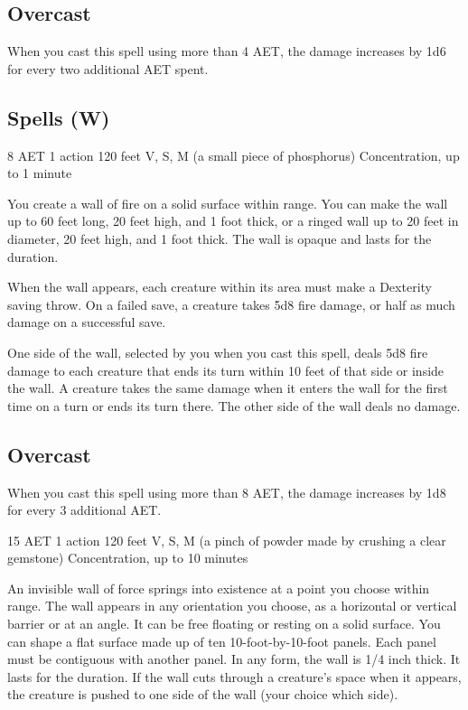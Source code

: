 \subsection*{Overcast} When you cast this spell using more than 4 AET, the damage increases by 1d6 for every two additional AET spent.

\subsection{Spells (W)}

{8 AET}
{1 action}
{120 feet}
{V, S, M (a small piece of phosphorus)}
{Concentration, up to 1 minute}

You create a wall of fire on a solid surface within range. You can make the wall up to 60 feet long, 20 feet high, and 1 foot thick, or a ringed wall up to 20 feet in diameter, 20 feet high, and 1 foot thick. The wall is opaque and lasts for the duration.

When the wall appears, each creature within its area must make a Dexterity saving throw. On a failed save, a creature takes 5d8 fire damage, or half as much damage on a successful save.

One side of the wall, selected by you when you cast this spell, deals 5d8 fire damage to each creature that ends its turn within 10 feet of that side or inside the wall. A creature takes the same damage when it enters the wall for the first time on a turn or ends its turn there. The other side of the wall deals no damage.

\subsection*{Overcast} When you cast this spell using more than 8 AET, the damage increases by 1d8 for every 3 additional AET.

{15 AET}
{1 action}
{120 feet}
{V, S, M (a pinch of powder made by crushing a clear gemstone)}
{Concentration, up to 10 minutes}

An invisible wall of force springs into existence at a point you choose within range. The wall appears in any orientation you choose, as a horizontal or vertical barrier or at an angle. It can be free floating or resting on a solid surface. You can shape a flat surface made up of ten 10-foot-by-10-foot panels. Each panel must be contiguous with another panel. In any form, the wall is 1/4 inch thick. It lasts for the duration. If the wall cuts through a creature's space when it appears, the creature is pushed to one side of the wall (your choice which side).

